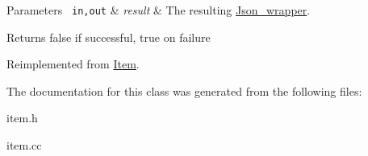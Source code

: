 \begin{DoxyParams}[1]{Parameters}
\mbox{\texttt{ in,out}}  & {\em result} & The resulting \mbox{\hyperlink{classJson__wrapper}{Json\+\_\+wrapper}}.\\
\hline
\end{DoxyParams}
\begin{DoxyReturn}{Returns}
false if successful, true on failure 
\end{DoxyReturn}


Reimplemented from \mbox{\hyperlink{classItem_a57e763fcde2d0a819d21e31c59611290}{Item}}.



The documentation for this class was generated from the following files\+:\begin{DoxyCompactItemize}
\item 
item.\+h\item 
item.\+cc\end{DoxyCompactItemize}
